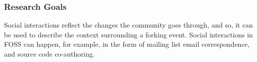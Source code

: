 \documentclass[12pt,letterpaper]{gthesis2}  %
\begin{document}

\subsubsection*{Research Goals}
\label{ResearchGoals}
\label{ResearchObjective}

Social interactions reflect the changes the community goes through, and so, it can be used to describe the context surrounding a forking event. Social interactions in FOSS can happen, for example, in the form of mailing list email correspondence, and source code co-authoring. 

%
%
\end{document}
